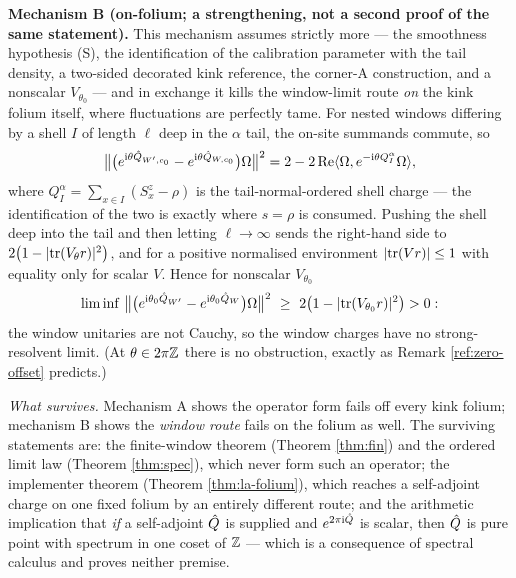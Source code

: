 \begin{refutedclaim}
\medskip\noindent\textbf{Mechanism B (on-folium; a strengthening, not a second
proof of the same statement).} This mechanism assumes strictly more --- the
smoothness hypothesis (S), the identification of the calibration parameter
with the tail density, a two-sided decorated kink reference, the corner-A
construction, and a nonscalar $V_{\theta_0}$ --- and in exchange it kills the
window-limit route \emph{on} the kink folium itself, where fluctuations are
perfectly tame. For nested windows differing by a shell $I$ of length $\ell$
deep in the $\alpha$ tail, the on-site summands commute, so
\begin{equation}
  \bigl\lVert\bigl(e^{\mathrm{i}\theta\hat{Q}_{W',c_0}}
    -e^{\mathrm{i}\theta\hat{Q}_{W,c_0}}\bigr)\Omega\bigr\rVert^{2}
  =2-2\operatorname{Re}
    \langle \Omega,e^{-\mathrm{i}\theta Q_I^{\alpha}}\Omega\rangle,
  \label{eq:mechB}
\end{equation}
where $Q_I^{\alpha}=\sum_{x\in I}(S^z_x-\rho)$ is the tail-normal-ordered
shell charge --- the identification of the two is exactly where $s=\rho$ is
consumed. Pushing the shell deep into the tail and then letting
$\ell\to\infty$ sends the right-hand side to
$2\bigl(1-\lvert \operatorname{tr}(V_\theta r)\rvert^{2}\bigr)$, and for a positive normalised
environment $\lvert \operatorname{tr}(Vr)\rvert\le1$ with equality only for scalar $V$. Hence for
nonscalar $V_{\theta_0}$
\begin{equation}
  \liminf\ \bigl\lVert\bigl(e^{\mathrm{i}\theta_0\Qhat_{W'}}
    -e^{\mathrm{i}\theta_0\Qhat_{W}}\bigr)\Omega\bigr\rVert^{2}
  \ \ge\ 2\bigl(1-\abs{\tr(V_{\theta_0}r)}^{2}\bigr)>0 :
  \label{eq:mechB-bound}
\end{equation}
the window unitaries are not Cauchy, so the window charges have no
strong-resolvent limit. (At $\theta\in2\pi\mathbb{Z}$ there is no obstruction, exactly
as Remark \ref{ref:zero-offset} predicts.)

\medskip\noindent\emph{What survives.} Mechanism A shows the operator form
fails off every kink folium; mechanism B shows the \emph{window route} fails
on the folium as well. The surviving statements are: the finite-window
theorem (Theorem \ref{thm:fin}) and the ordered limit law (Theorem
\ref{thm:spec}), which never form such an operator; the implementer theorem
(Theorem \ref{thm:la-folium}), which reaches a self-adjoint charge on one
fixed folium by an entirely different route; and the arithmetic implication
that \emph{if} a self-adjoint $\hat{Q}$ is supplied and $e^{2\pi\mathrm{i}\hat{Q}}$
is scalar, then $\hat{Q}$ is pure point with spectrum in one coset of $\mathbb{Z}$ ---
which is a consequence of spectral calculus and proves neither premise.
\end{refutedclaim}

